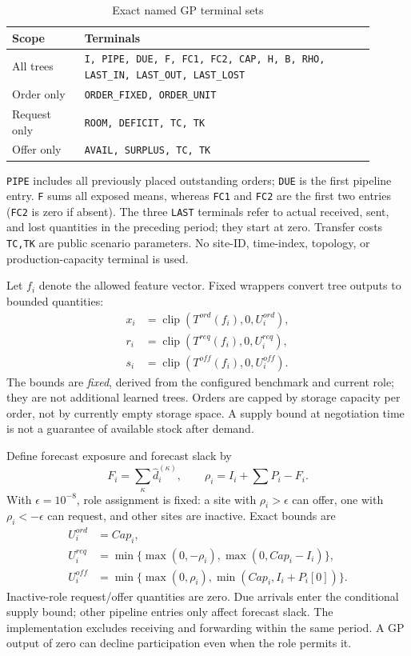 \begin{table}[t]
\centering
\caption{Exact named GP terminal sets}
\label{tab:terminals}
\footnotesize
\begin{tabular}{p{0.18\linewidth}p{0.72\linewidth}}
\toprule
Scope & Terminals \\
\midrule
All trees & \texttt{I, PIPE, DUE, F, FC1, FC2, CAP, H, B, RHO,
LAST\_IN, LAST\_OUT, LAST\_LOST} \\
Order only & \texttt{ORDER\_FIXED, ORDER\_UNIT} \\
Request only & \texttt{ROOM, DEFICIT, TC, TK} \\
Offer only & \texttt{AVAIL, SURPLUS, TC, TK} \\
\bottomrule
\end{tabular}
\end{table}
\texttt{PIPE} includes all previously placed outstanding orders;
\texttt{DUE} is the first pipeline entry. \texttt{F} sums all exposed means,
whereas \texttt{FC1} and \texttt{FC2} are the first two entries
(\texttt{FC2} is zero if absent). The three \texttt{LAST} terminals refer to
actual received, sent, and lost quantities in the preceding period; they
start at zero. Transfer costs \texttt{TC,TK} are public scenario parameters.
No site-ID, time-index, topology, or production-capacity terminal is used.

Let $f_i$ denote the allowed feature vector. Fixed wrappers convert tree
outputs to bounded quantities:
\begin{align}
    x_i &= \operatorname{clip}(T^{ord}(f_i),0,U_i^{ord}),\\
    r_i &= \operatorname{clip}(T^{req}(f_i),0,U_i^{req}),\\
    s_i &= \operatorname{clip}(T^{off}(f_i),0,U_i^{off}).
    \label{eq:skill-outputs}
\end{align}
The bounds are \emph{fixed}, derived from the configured benchmark and current role;
they are not additional learned trees. Orders are capped by storage
capacity per order, not by currently empty storage space. A supply bound at
negotiation time is not a guarantee of available stock after demand.

Define forecast exposure and forecast slack by
\begin{equation}
 F_i=\sum_{\kappa}\hat d_i^{(\kappa)},\qquad
 \rho_i=I_i+\sum P_i-F_i.
 \label{eq:slack}
\end{equation}
With $\epsilon=10^{-8}$, role assignment is fixed: a site with
$\rho_i>\epsilon$ can offer, one with $\rho_i<-\epsilon$ can request,
and other sites are inactive. Exact bounds are
\begin{align}
 U_i^{ord}&=Cap_i,\\
 U_i^{req}&=\min\{\max(0,-\rho_i),\max(0,Cap_i-I_i)\},\\
 U_i^{off}&=\min\{\max(0,\rho_i),\min(Cap_i,I_i+P_i[0])\}.
\end{align}
Inactive-role request/offer quantities are zero. Due arrivals enter the
conditional supply bound; other pipeline entries only affect forecast
slack. The implementation excludes receiving and forwarding within the
same period. A GP output of zero can decline participation even when the
role permits it.

